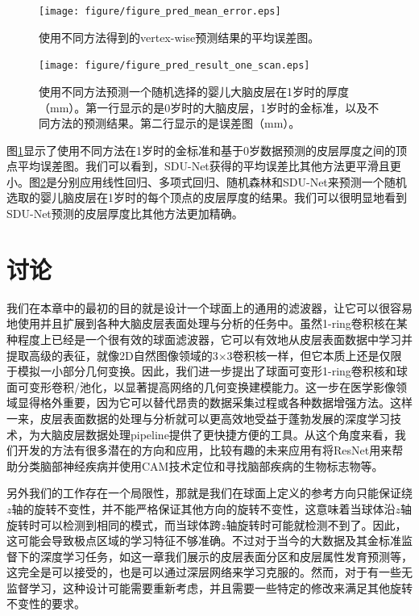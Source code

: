 \begin{figure}[t]
	\centering
	\texttt{[image: figure/figure\_pred\_mean\_error.eps]}
	\caption{使用不同方法得到的vertex-wise预测结果的平均误差图。}
	\label{fig:thickness_prediction_mean_error}
\end{figure}

\begin{figure}[t]
	\centering
	\texttt{[image: figure/figure\_pred\_result\_one\_scan.eps]}
	\caption{使用不同方法预测一个随机选择的婴儿大脑皮层在1岁时的厚度（mm）。第一行显示的是0岁时的大脑皮层，1岁时的金标准，以及不同方法的预测结果。第二行显示的是误差图（mm）。}
	\label{fig:thickness_prediction_result_one_scan}
\end{figure}

图\ref{fig:thickness_prediction_mean_error}显示了使用不同方法在1岁时的金标准和基于0岁数据预测的皮层厚度之间的顶点平均误差图。我们可以看到，SDU-Net获得的平均误差比其他方法更平滑且更小。图\ref{fig:thickness_prediction_result_one_scan}是分别应用线性回归、多项式回归、随机森林和SDU-Net来预测一个随机选取的婴儿脑皮层在1岁时的每个顶点的皮层厚度的结果。我们可以很明显地看到SDU-Net预测的皮层厚度比其他方法更加精确。


\section{讨论}
我们在本章中的最初的目的就是设计一个球面上的通用的滤波器，让它可以很容易地使用并且扩展到各种大脑皮层表面处理与分析的任务中。虽然1-ring卷积核在某种程度上已经是一个很有效的球面滤波器，它可以有效地从皮层表面数据中学习并提取高级的表征，就像2D自然图像领域的3$\times$3卷积核一样，但它本质上还是仅限于模拟一小部分几何变换。因此，我们进一步提出了球面可变形1-ring卷积核和球面可变形卷积/池化，以显著提高网络的几何变换建模能力。这一步在医学影像领域显得格外重要，因为它可以替代昂贵的数据采集过程或各种数据增强方法。这样一来，皮层表面数据的处理与分析就可以更高效地受益于蓬勃发展的深度学习技术，为大脑皮层数据处理pipeline提供了更快捷方便的工具。从这个角度来看，我们开发的方法有很多潜在的方向和应用，比较有趣的未来应用有将ResNet\cite{he2016deep}用来帮助分类脑部神经疾病并使用CAM技术\cite{zhou2015cnnlocalization}定位和寻找脑部疾病的生物标志物等。

另外我们的工作存在一个局限性，那就是我们在球面上定义的参考方向只能保证绕$z$轴的旋转不变性，并不能严格保证其他方向的旋转不变性，这意味着当球体沿$z$轴旋转时可以检测到相同的模式，而当球体跨$z$轴旋转时可能就检测不到了。因此，这可能会导致极点区域的学习特征不够准确。不过对于当今的大数据及其金标准监督下的深度学习任务，如这一章我们展示的皮层表面分区和皮层属性发育预测等，这完全是可以接受的，也是可以通过深层网络来学习克服的。然而，对于有一些无监督学习，这种设计可能需要重新考虑，并且需要一些特定的修改来满足其他旋转不变性的要求。

